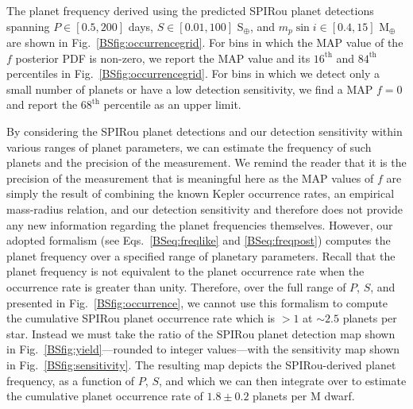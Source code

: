 The planet frequency derived using the predicted SPIRou planet detections spanning
$P \in [0.5,200]$ days, $S \in [0.01,100]$ S$_{\oplus}$, and $m_p\sin{i} \in [0.4,15]$ M$_{\oplus}$
are shown in Fig.~\ref{BSfig:occurrencegrid}. For bins in which the MAP value of the $f$ posterior PDF
is non-zero, we report the MAP value and its $16^{\text{th}}$ and $84^{\text{th}}$ percentiles in
Fig.~\ref{BSfig:occurrencegrid}. For bins
in which we detect only a small number of planets or have a low detection sensitivity, we find a MAP
$f=0$ and report the $68^{\text{th}}$ percentile as an upper limit.

By considering the SPIRou planet detections and our detection sensitivity within various ranges of planet
parameters, we can estimate the frequency of such planets and the precision of the measurement. We remind
the reader that it is the precision of the measurement that is meaningful here as the MAP values of $f$
are simply the result of combining the known Kepler occurrence rates, an empirical mass-radius relation,
and our detection sensitivity and therefore does not provide any new information regarding the planet
frequencies themselves. However, our adopted formalism (see Eqs.~\ref{BSeq:freqlike} and \ref{BSeq:freqpost})
computes the planet frequency over a specified range of planetary parameters.
Recall that the planet frequency is not equivalent to the planet occurrence rate when the occurrence
rate is greater than unity. Therefore, over the full range of $P$, $S$, and \msini{} presented in
Fig.~\ref{BSfig:occurrence}, we cannot use this formalism to compute the cumulative SPIRou planet occurrence
rate which is $>1$ at $\sim 2.5$ planets per star. Instead we must take the ratio of the 
SPIRou planet detection map shown in Fig.~\ref{BSfig:yield}---rounded to integer values---with the
sensitivity map shown in Fig.~\ref{BSfig:sensitivity}.
The resulting map depicts the SPIRou-derived planet frequency,
as a function of $P$, $S$, and \msini{,} which we can then integrate over to estimate the cumulative
planet occurrence rate of $1.8 \pm 0.2$ planets per M dwarf.


